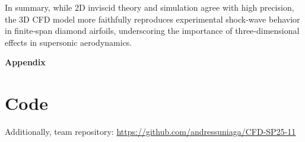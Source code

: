 \documentclass[11pt]{article}
\begin{document}
In summary, while 2D inviscid theory and simulation agree with high precision, the 3D CFD model more faithfully reproduces experimental shock‐wave behavior in finite‐span diamond airfoils, underscoring the importance of three‐dimensional effects in supersonic aerodynamics.


\pagebreak
\appendix
{} 
\begin{center}
\vspace*{\fill}
   \Huge \bf Appendix 
\vspace*{\fill}
\end{center}
\pagebreak 

\hypertarget{code}{}
\section{Code}

Additionally, team repository: \url{https://github.com/andressuniaga/CFD-SP25-11}
\vspace{2.5mm}
\end{document}
